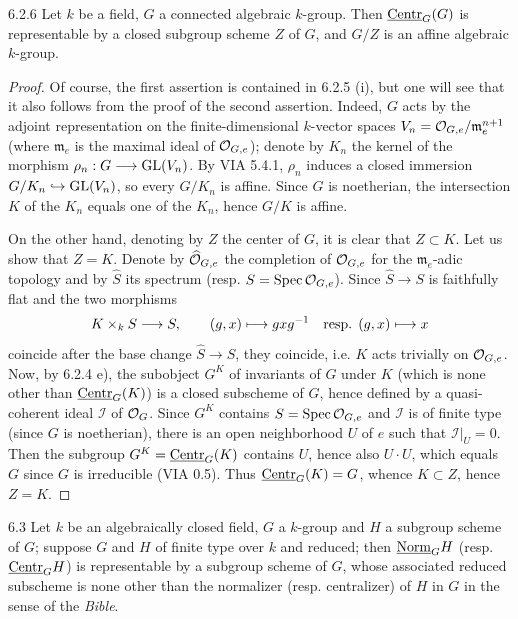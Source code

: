 \begin{corollary}{6.2.6}\label{VIB.6.2.6}
Let $k$ be a field, $G$ a connected algebraic $k$-group. Then $\underline{\mathrm{Centr}}_G(G)$ is representable by a closed subgroup scheme $Z$ of $G$, and $G/Z$ is an affine algebraic $k$-group.
\end{corollary}
\begin{proof}
Of course, the first assertion is contained in 6.2.5 (i), but one will see that it also follows from the proof of the second assertion. Indeed, $G$ acts by the adjoint representation on the finite-dimensional $k$-vector spaces $V_n=\mathcal{O}_{G,e}/\mathfrak m_e^{n+1}$ (where $\mathfrak m_e$ is the maximal ideal of $\mathcal{O}_{G,e}$); denote by $K_n$ the kernel of the morphism $\rho_n:G\longrightarrow\operatorname{GL}(V_n)$. By VIA 5.4.1, $\rho_n$ induces a closed immersion $G/K_n\hookrightarrow\operatorname{GL}(V_n)$, so every $G/K_n$ is affine. Since $G$ is noetherian, the intersection $K$ of the $K_n$ equals one of the $K_n$, hence $G/K$ is affine.

On the other hand, denoting by $Z$ the center of $G$, it is clear that $Z\subset K$. Let us show that $Z=K$. Denote by $\widehat{\mathcal{O}}_{G,e}$ the completion of $\mathcal{O}_{G,e}$ for the $\mathfrak m_e$-adic topology and by $\widehat S$ its spectrum (resp. $S=\operatorname{Spec}\mathcal{O}_{G,e}$). Since $\widehat S\to S$ is faithfully flat and the two morphisms
\[
K\times_kS\longrightarrow S,\qquad(g,x)\longmapsto gxg^{-1}\quad\text{resp. }(g,x)\longmapsto x
\]
coincide after the base change $\widehat S\to S$, they coincide, i.e. $K$ acts trivially on $\mathcal{O}_{G,e}$. Now, by 6.2.4 e), the subobject $G^K$ of invariants of $G$ under $K$ (which is none other than $\underline{\mathrm{Centr}}_G(K)$) is a closed subscheme of $G$, hence defined by a quasi-coherent ideal $\mathcal I$ of $\mathcal{O}_G$. Since $G^K$ contains $S=\operatorname{Spec}\mathcal{O}_{G,e}$ and $\mathcal I$ is of finite type (since $G$ is noetherian), there is an open neighborhood $U$ of $e$ such that $\mathcal I|_U=0$. Then the subgroup $G^K=\underline{\mathrm{Centr}}_G(K)$ contains $U$, hence also $U\cdot U$, which equals $G$ since $G$ is irreducible (VIA 0.5). Thus $\underline{\mathrm{Centr}}_G(K)=G$, whence $K\subset Z$, hence $Z=K$.
\end{proof}
\begin{remark}{6.3}\label{VIB.6.3}
Let $k$ be an algebraically closed field, $G$ a $k$-group and $H$ a subgroup scheme of $G$; suppose $G$ and $H$ of finite type over $k$ and reduced; then $\underline{\mathrm{Norm}}_GH$ (resp. $\underline{\mathrm{Centr}}_GH$) is representable by a subgroup scheme of $G$, whose associated reduced subscheme is none other than the normalizer (resp. centralizer) of $H$ in $G$ in the sense of the \emph{Bible}.
\end{remark}
